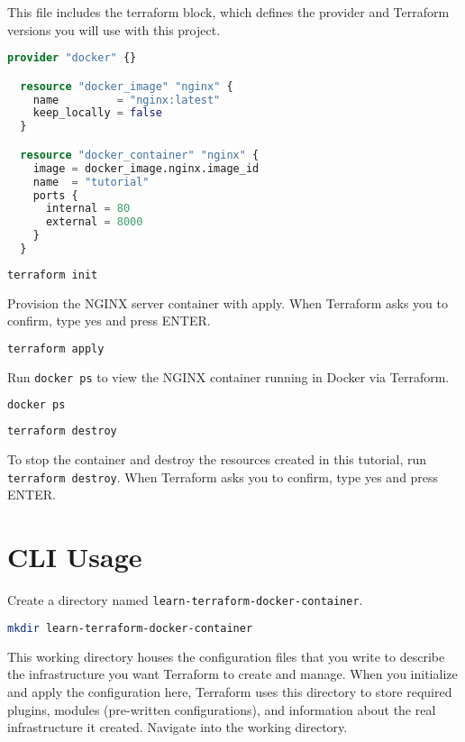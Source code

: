 \documentclass[../main.tex]{subfiles}
\begin{document}
This file includes the terraform block, which defines the provider and Terraform versions you will use with this project.

\begin{lstlisting}[caption=main.tf,language=Terraform]
  provider "docker" {}

  resource "docker_image" "nginx" {
    name         = "nginx:latest"
    keep_locally = false
  }

  resource "docker_container" "nginx" {
    image = docker_image.nginx.image_id
    name  = "tutorial"
    ports {
      internal = 80
      external = 8000
    }
  }
\end{lstlisting}

\begin{lstlisting}[language=bash]
  terraform init
\end{lstlisting}

Provision the NGINX server container with apply. When Terraform asks you to confirm, type yes and press ENTER.

\begin{lstlisting}[language=bash]
  terraform apply
\end{lstlisting}

Run \lstinline{docker ps} to view the NGINX container running in Docker via Terraform.

\begin{lstlisting}[language=bash]
  docker ps
\end{lstlisting}

\begin{lstlisting}[language=bash]
  terraform destroy
\end{lstlisting}
To stop the container and destroy the resources created in this tutorial, run \lstinline{terraform destroy}. When Terraform asks you to confirm, type yes and press ENTER.

\section{CLI Usage} 

Create a directory named \lstinline{learn-terraform-docker-container}.
\begin{lstlisting}[language=bash]
  mkdir learn-terraform-docker-container
\end{lstlisting}

This working directory houses the configuration files that you write to describe the infrastructure you want Terraform to create and manage.
When you initialize and apply the configuration here, Terraform uses this directory to store required plugins, modules (pre-written configurations), and information about the real infrastructure it created.
Navigate into the working directory.
\end{document}
